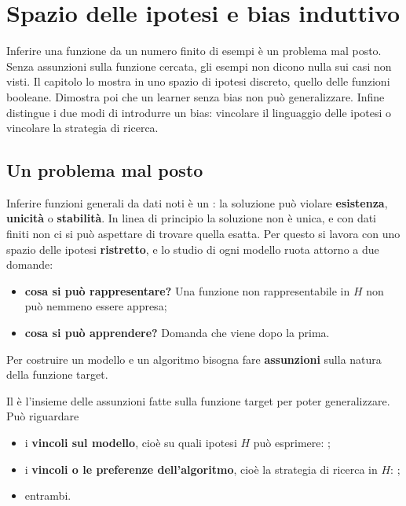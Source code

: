 \chapter{Spazio delle ipotesi e bias induttivo}
\label{cap:bias}

\begin{inbreve}
Inferire una funzione da un numero finito di esempi è un problema mal posto. Senza assunzioni sulla funzione
cercata, gli esempi non dicono nulla sui casi non visti. Il capitolo lo mostra in uno spazio di ipotesi
discreto, quello delle funzioni booleane. Dimostra poi che un learner senza bias non può generalizzare. Infine
distingue i due modi di introdurre un bias: vincolare il linguaggio delle ipotesi o vincolare la strategia di
ricerca.
\end{inbreve}

\section{Un problema mal posto}

Inferire funzioni generali da dati noti è un : la soluzione può violare
\textbf{esistenza}, \textbf{unicità} o \textbf{stabilità}. In linea di principio la soluzione non è unica, e con
dati finiti non ci si può aspettare di trovare quella esatta. Per questo si lavora con uno spazio delle ipotesi
\textbf{ristretto}, e lo studio di ogni modello ruota attorno a due domande:
\begin{itemize}
  \item \textbf{cosa si può rappresentare?} Una funzione non rappresentabile in $H$ non può nemmeno essere appresa;
  \item \textbf{cosa si può apprendere?} Domanda che viene dopo la prima.
\end{itemize}

Per costruire un modello e un algoritmo bisogna fare \textbf{assunzioni} sulla natura della funzione target.

\begin{definizione}
Il  è l'insieme delle assunzioni fatte sulla funzione target per poter generalizzare.
Può riguardare
\begin{itemize}
  \item i \textbf{vincoli sul modello}, cioè su quali ipotesi $H$ può esprimere: ;
  \item i \textbf{vincoli o le preferenze dell'algoritmo}, cioè la strategia di ricerca in $H$: ;
  \item entrambi.
\end{itemize}
\end{definizione}

